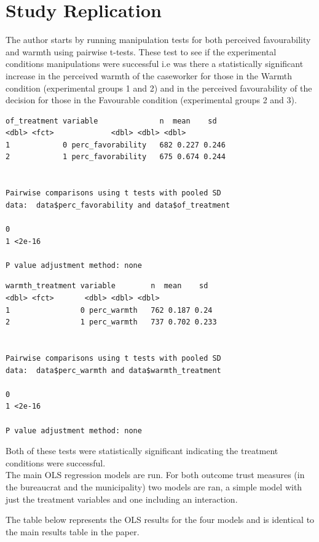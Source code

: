 \documentclass[12pt,letterpaper]{article}
\begin{document}
\section{Study Replication}
	The author starts by running manipulation tests for both perceived favourability and warmth using pairwise t-tests. These test to see if the experimental conditions manipulations were successful i.e was there a statistically significant increase in the perceived warmth of the caseworker for those in the Warmth condition (experimental groups 1 and 2)  and in the perceived favourability of the decision for those in the Favourable condition (experimental groups 2 and 3). 
	
	\begin{Verbatim}
of_treatment variable              n  mean    sd
<dbl> <fct>             <dbl> <dbl> <dbl>
1            0 perc_favorability   682 0.227 0.246
2            1 perc_favorability   675 0.674 0.244


Pairwise comparisons using t tests with pooled SD 
data:  data$perc_favorability and data$of_treatment 

0     
1 <2e-16

P value adjustment method: none 
	\end{Verbatim}
	\FloatBarrier
	
	\begin{Verbatim}
warmth_treatment variable        n  mean    sd
<dbl> <fct>       <dbl> <dbl> <dbl>
1                0 perc_warmth   762 0.187 0.24 
2                1 perc_warmth   737 0.702 0.233


Pairwise comparisons using t tests with pooled SD 
data:  data$perc_warmth and data$warmth_treatment 

0     
1 <2e-16

P value adjustment method: none 
	\end{Verbatim}
	\FloatBarrier
	Both of these tests were statistically significant indicating the treatment conditions were successful. \\
	
	The main OLS regression models are run. For both outcome trust measures (in the bureaucrat and the municipality) two models are ran, a simple model with just the treatment variables and one including an interaction. 
	
	
	 The table below represents the OLS results for the four models and is identical to the main results table in the paper. 
	 
\end{document}

